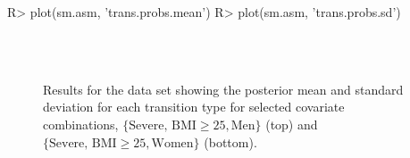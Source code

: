 \begin{example}
R> plot(sm.asm, 'trans.probs.mean')
R> plot(sm.asm, 'trans.probs.sd')
\end{example}


\begin{figure}[!ht]
\centering
{}\\
\\
\caption{Results for the  data set showing the posterior mean and standard deviation for each transition type for selected covariate combinations, $\{\text{Severe, BMI}\ge25,\text{Men}\}$ (top) and $\{\text{Severe, BMI}\ge25,\text{Women}\}$ (bottom).
 }
\label{fig:post_mean_asthma}
\end{figure}


